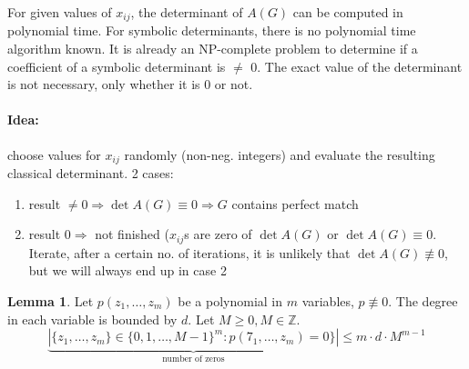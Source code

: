 \documentclass[11pt]{article}
\theoremstyle{definition}
\newtheorem{lemma}[theorem]{Lemma}
\theoremstyle{definition}
\begin{document}
\medskip

For given values of $ x_{ij} $, the determinant of $ A (G) $ can be computed in polynomial time. For symbolic determinants, there is no polynomial time algorithm known. It is already an NP-complete problem to determine if a coefficient of a symbolic determinant is $ \neq $ 0. The exact value of the determinant is not necessary, only whether it is 0 or not.

\paragraph{Idea:} choose values for $ x_{ij} $ randomly (non-neg. integers) and evaluate the resulting classical determinant. 2 cases:
\begin{enumerate}
\item result $ \neq 0 \Rightarrow \det A (G) \equiv 0 \Rightarrow G $ contains perfect match
\item result $ 0 \Rightarrow $ not finished ($ x_{ij}$s are zero of $ \det A (G) $ or $ \det A(G) \equiv 0 $. Iterate, after a certain no. of iterations, it is unlikely that $ \det A (G) \not\equiv 0$, but we will always end up in case 2
\end{enumerate}

\begin{lemma}

Let $ p (z_1, \dots, z_m) $ be a polynomial in $ m $ variables, $ p \not\equiv 0 $. The degree in each variable is bounded by $ d $. Let $ M \geq 0, M \in \mathbb{Z} $.
\[ \underbrace{| \{ z_1, \dots, z_m \} \in \{ 0, 1, \dots, M-1\}^m : p (7_1, \dots, z_m) = 0 \} |}_{\text{number of zeros}} \leq m \cdot d \cdot M^{m-1} \]

\end{lemma}
\end{document}

